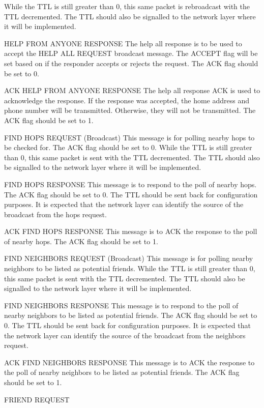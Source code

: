 \documentclass[journal,compsoc]{IEEEtran}
\begin{document}
\begin{LaTeXdescription}
  While the TTL is still greater than 0, this same packet is rebroadcast with the TTL decremented. The TTL should also be signalled to the network layer where it will be implemented.
  \item[HELP FROM ANYONE RESPONSE]
  The help all response is to be used to accept the HELP ALL REQUEST broadcast message. The ACCEPT flag will be set based on if the responder accepts or rejects the request. 
  The ACK flag should be set to 0.
  \item[ACK HELP FROM ANYONE RESPONSE]
  The help all response ACK is used to acknowledge the response. If the response was accepted, the home address and phone number will be transmitted. Otherwise, they will not be transmitted. 
  The ACK flag should be set to 1.
  \item[FIND HOPS REQUEST (Broadcast)]
  This message is for polling nearby hops to be checked for. 
  The ACK flag should be set to 0.
  While the TTL is still greater than 0, this same packet is sent with the TTL decremented. The TTL should also be signalled to the network layer where it will be implemented.
  \item[FIND HOPS RESPONSE]
  This message is to respond to the poll of nearby hops.
  The ACK flag should be set to 0.
  The TTL should be sent back for configuration purposes.
  It is expected that the network layer can identify the source of the broadcast from the hops request.
  \item[ACK FIND HOPS RESPONSE]
  This message is to ACK the response to the poll of nearby hops.
  The ACK flag should be set to 1.
  \item[FIND NEIGHBORS REQUEST (Broadcast)]
  This message is for polling nearby neighbors to be listed as potential friends.
  While the TTL is still greater than 0, this same packet is sent with the TTL decremented. The TTL should also be signalled to the network layer where it will be implemented.
  \item[FIND NEIGHBORS RESPONSE]
  This message is to respond to the poll of nearby neighbors to be listed as potential friends. 
  The ACK flag should be set to 0. 
  The TTL should be sent back for configuration purposes.
  It is expected that the network layer can identify the source of the broadcast from the neighbors request.
  \item[ACK FIND NEIGHBORS RESPONSE]
  This message is to ACK the response to the poll of nearby neighbors to be listed as potential friends. 
  The ACK flag should be set to 1.
  \item[FRIEND REQUEST]

\end{LaTeXdescription}
\end{document}
